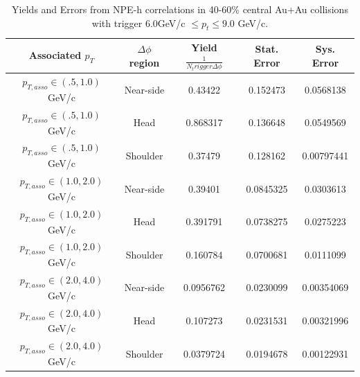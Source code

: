 \begin{table}
\centering
\begin{tabular}{|c|c|c|c|c|}
\hline
Associated $p_T$	& $\Delta\phi$ region & Yield $\frac{1}{N_trigger \Delta\phi}$ & Stat. Error & Sys. Error\\
\hline
$p_{T,asso} \in(.5, 1.0)$ GeV/c  & Near-side & 0.43422 & 0.152473 & 0.0568138 \\
\hline
$p_{T,asso} \in(.5, 1.0)$ GeV/c  & Head & 0.868317 & 0.136648 & 0.0549569 \\
\hline
$p_{T,asso} \in(.5, 1.0)$ GeV/c  & Shoulder & 0.37479 & 0.128162 & 0.00797441 \\
\hline
$p_{T,asso} \in(1.0, 2.0)$ GeV/c  & Near-side & 0.39401 & 0.0845325 & 0.0303613 \\
\hline
$p_{T,asso} \in(1.0, 2.0)$ GeV/c  & Head & 0.391791 & 0.0738275 & 0.0275223 \\
\hline
$p_{T,asso} \in(1.0, 2.0)$ GeV/c  & Shoulder & 0.160784 & 0.0700681 & 0.0111099 \\
\hline
$p_{T,asso} \in(2.0, 4.0)$ GeV/c  & Near-side & 0.0956762 & 0.0230099 & 0.00354069 \\
\hline
$p_{T,asso} \in(2.0, 4.0)$ GeV/c  & Head & 0.107273 & 0.0231531 & 0.00321996 \\
\hline
$p_{T,asso} \in(2.0, 4.0)$ GeV/c  & Shoulder & 0.0379724 & 0.0194678 & 0.00122931 \\
\hline
\end{tabular}
\caption[Yields and Errors in Au+Au Correlations, 40-60\%, High Trigger]{Yields and Errors from NPE-h correlations in 40-60\% central Au+Au collisions with trigger $6.0 $GeV/c $\leq p_t \leq 9.0$ GeV/c.}
\label{tab:AuAuYieldPeriHigh}
\end{table} 

